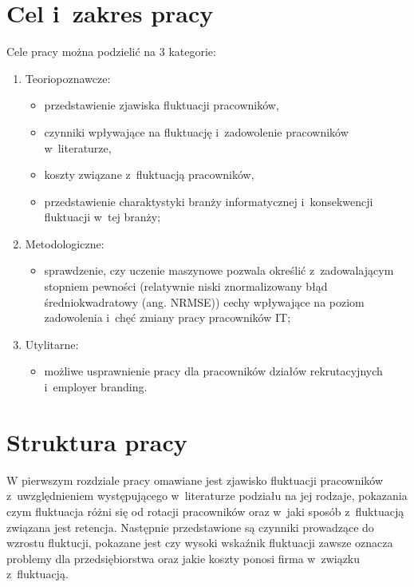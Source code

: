 \section*{Cel i~zakres pracy}\label{sec:admission:thesis-goal}

Cele pracy można podzielić na 3 kategorie:
\begin{enumerate}
    \item Teoriopoznawcze:
    \begin{itemize}
        \item przedstawienie zjawiska fluktuacji pracowników,
        \item czynniki wpływające na fluktuację i~zadowolenie pracowników w~literaturze,
        \item koszty związane z~fluktuacją pracowników,
        \item przedstawienie charaktystyki branży informatycznej i~konsekwencji fluktuacji w~tej branży;
    \end{itemize}
    \item Metodologiczne:
    \begin{itemize}
        \item sprawdzenie, czy uczenie maszynowe pozwala określić z~zadowalającym stopniem pewności (relatywnie niski znormalizowany błąd średniokwadratowy (ang. NRMSE)) cechy wpływające na poziom zadowolenia i~chęć zmiany pracy pracowników IT;
    \end{itemize}
    \pagebreak %
    \item Utylitarne:
    \begin{itemize}
        \item możliwe usprawnienie pracy dla pracowników działów rekrutacyjnych i~employer branding.
    \end{itemize}
\end{enumerate}

\section*{Struktura pracy}\label{sec:admission:thesis-structure}

W pierwszym rozdziale pracy omawiane jest zjawisko fluktuacji pracowników z~uwzględnieniem występującego w~literaturze podziału na jej rodzaje,
pokazania czym fluktuacja różni się od rotacji pracowników oraz w~jaki sposób z~fluktuacją związana jest retencja.
Następnie przedstawione są czynniki prowadzące do wzrostu fluktucji, pokazane jest czy wysoki wskaźnik fluktuacji zawsze oznacza problemy dla przedsiębiorstwa
oraz jakie koszty ponosi firma w~związku z~fluktuacją.

